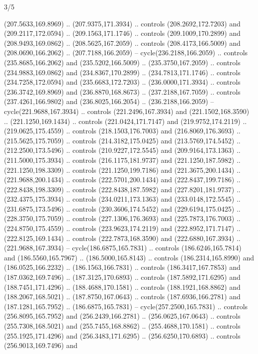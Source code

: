 \begin{flagdescription}{3/5}
\begin{scope}[scale=0.00214\flagwidth,yshift=162mm]
\begin{scope}[y=-0.8pt, x=0.8pt, inner sep=0pt, outer sep=0pt]
\begin{scope}[draw,fill=gold,line join=round,line cap=round,line width=0.0025\flagwidth]
\begin{scope}[line width=0.0025\flagwidth]
(207.5633,169.8969) .. (207.9375,171.3934) .. controls (208.2692,172.7203) and
(209.2117,172.0594) .. (209.1563,171.1746) .. controls (209.1009,170.2899) and
(208.9493,169.0862) .. (208.5625,167.2059) .. controls (208.4173,166.5009) and
(208.0690,166.2062) .. (207.7188,166.2059) -- cycle(236.2188,166.2059) ..
controls (235.8685,166.2062) and (235.5202,166.5009) .. (235.3750,167.2059) ..
controls (234.9883,169.0862) and (234.8367,170.2899) .. (234.7813,171.1746) ..
controls (234.7258,172.0594) and (235.6683,172.7203) .. (236.0000,171.3934) ..
controls (236.3742,169.8969) and (236.8870,168.8673) .. (237.2188,167.7059) ..
controls (237.4261,166.9802) and (236.8025,166.2054) .. (236.2188,166.2059) --
cycle(221.9688,167.3934) .. controls (221.2496,167.3934) and
(221.1502,168.3590) .. (221.1250,169.1434) .. controls (221.0424,171.7147) and
(219.9752,174.2119) .. (219.0625,175.4559) .. controls (218.1503,176.7003) and
(216.8069,176.3693) .. (215.5625,175.7059) .. controls (214.3182,175.0425) and
(213.5769,174.5452) .. (212.2500,173.5496) .. controls (210.9227,172.5545) and
(209.9164,173.1363) .. (211.5000,175.3934) .. controls (216.1175,181.9737) and
(221.1250,187.5982) .. (221.1250,198.3309) .. controls (221.1250,199.7186) and
(221.3675,200.1434) .. (221.9688,200.1434) .. controls (222.5701,200.1434) and
(222.8437,199.7186) .. (222.8438,198.3309) .. controls (222.8438,187.5982) and
(227.8201,181.9737) .. (232.4375,175.3934) .. controls (234.0211,173.1363) and
(233.0148,172.5545) .. (231.6875,173.5496) .. controls (230.3606,174.5452) and
(229.6194,175.0425) .. (228.3750,175.7059) .. controls (227.1306,176.3693) and
(225.7873,176.7003) .. (224.8750,175.4559) .. controls (223.9623,174.2119) and
(222.8952,171.7147) .. (222.8125,169.1434) .. controls (222.7873,168.3590) and
(222.6880,167.3934) .. (221.9688,167.3934) -- cycle(186.6875,165.7831) ..
controls (186.6246,165.7814) and (186.5560,165.7967) .. (186.5000,165.8143) ..
controls (186.2314,165.8990) and (186.0525,166.2232) .. (186.1563,166.7831) ..
controls (186.3417,167.7853) and (187.0362,169.7496) .. (187.3125,170.6893) ..
controls (187.5892,171.6295) and (188.7451,171.4296) .. (188.4688,170.1581) ..
controls (188.1921,168.8862) and (188.2067,168.5021) .. (187.8750,167.0643) ..
controls (187.6936,166.2781) and (187.1281,165.7952) .. (186.6875,165.7831) --
cycle(257.2500,165.7831) .. controls (256.8095,165.7952) and
(256.2439,166.2781) .. (256.0625,167.0643) .. controls (255.7308,168.5021) and
(255.7455,168.8862) .. (255.4688,170.1581) .. controls (255.1925,171.4296) and
(256.3483,171.6295) .. (256.6250,170.6893) .. controls (256.9013,169.7496) and

\end{scope}
\end{scope}
\end{scope}
\end{scope}
\end{flagdescription}
